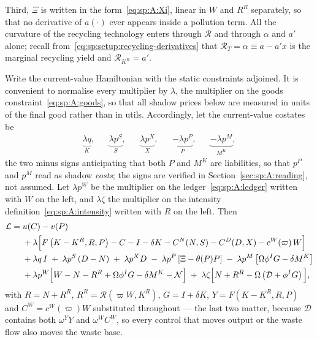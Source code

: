 Third, $\Xi$ is written in the form~\eqref{eq:sp:A:Xi}, linear in $W$ and $R^R$ separately, so that no
derivative of $a(\cdot)$ ever appears inside a pollution term. All the curvature of the recycling
technology enters through $\mathcal R$ and through $\alpha$ and $a'$ alone; recall
from~\eqref{eq:sp:setup:recycling-derivatives} that $\mathcal R_T=\alpha\equiv a-a'x$ is the marginal
recycling yield and $\mathcal R_{K^R}=a'$.

 Write the current-value Hamiltonian with the static constraints
adjoined. It is convenient to normalise every multiplier by $\lambda$, the multiplier on the goods
constraint~\eqref{eq:sp:A:goods}, so that all shadow prices below are measured in units of the final
good rather than in utils. Accordingly, let the current-value costates be
\begin{align}
\underbrace{\lambda q}_{K},
&&
\underbrace{\lambda p^S}_{S},
&&
\underbrace{\lambda p^X}_{X},
&&
\underbrace{-\lambda p^P}_{P},
&&
\underbrace{-\lambda p^M}_{M^K},
\label{eq:sp:A:costates-def}
\end{align}
the two minus signs anticipating that both $P$ and $M^K$ are liabilities, so that $p^P$ and $p^M$
read as shadow \emph{costs}; the signs are verified in Section~\ref{sec:sp:A:reading}, not assumed.
Let $\lambda p^W$ be the multiplier on the ledger~\eqref{eq:sp:A:ledger} written with $W$ on the left,
and $\lambda\zeta$ the multiplier on the intensity definition~\eqref{eq:sp:A:intensity} written with
$R$ on the left. Then
\begin{align}
\mathcal L
={}& u(C)-v(P)
\notag\\
&+\lambda\Big[F\left(K-K^R,R,P\right)-C-I-\delta K-C^N(N,S)-C^D(D,X)-c^W\!\left(\varpi\right)W\Big]
\notag\\
&+\lambda q\,I
\;+\;\lambda p^S\left(D-N\right)
\;+\;\lambda p^X D
\;-\;\lambda p^P\left[\Xi-\theta(P)P\right]
\;-\;\lambda p^M\left[\Omega\phi^IG-\delta M^K\right]
\notag\\
&+\lambda p^W\Big[W-N-R^R+\Omega\phi^IG-\delta M^K-\mathcal N\Big]
\;+\;\lambda \zeta\Big[N+R^R-\Omega\left(\mathcal D+\phi^IG\right)\Big],
\label{eq:sp:A:lagrangian}
\end{align}
with $R=N+R^R$, $R^R=\mathcal R\left(\varpi W,K^R\right)$, $G=I+\delta K$, $Y=F\left(K-K^R,R,P\right)$
and $C^W=c^W\!\left(\varpi\right)W$ substituted throughout --- the last two matter, because $\mathcal D$
contains both $\omega^YY$ and $\omega^WC^W$, so every control that moves output or the waste flow also
moves the waste base.


